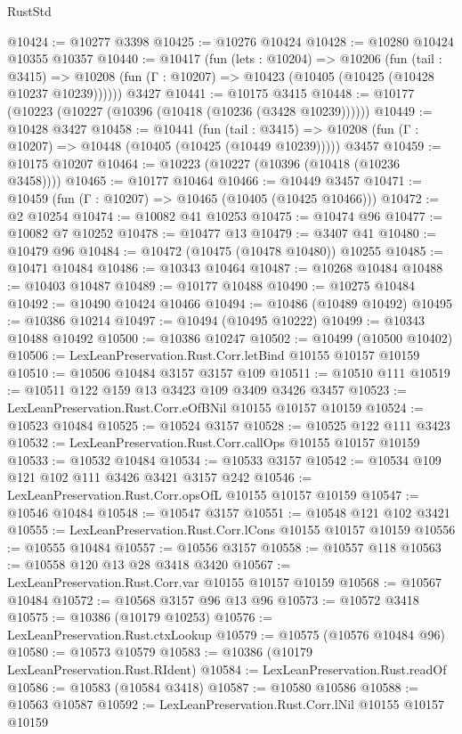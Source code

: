 \begin{lexlean}{RustStd}
\begin{coremodule}
@10424 := @10277 @3398
@10425 := @10276 @10424
@10428 := @10280 @10424 @10355 @10357
@10440 := @10417
    (fun (lets : @10204) =>
    @10206
      (fun (tail : @3415) =>
      @10208 (fun (Γ : @10207) => @10423 (@10405 (@10425 (@10428 @10237 @10239))))))
    @3427
@10441 := @10175 @3415
@10448 := @10177 (@10223 (@10227 (@10396 (@10418 (@10236 (@3428 @10239))))))
@10449 := @10428 @3427
@10458 := @10441
    (fun (tail : @3415) => @10208 (fun (Γ : @10207) => @10448 (@10405 (@10425 (@10449 @10239)))))
    @3457
@10459 := @10175 @10207
@10464 := @10223 (@10227 (@10396 (@10418 (@10236 @3458))))
@10465 := @10177 @10464
@10466 := @10449 @3457
@10471 := @10459 (fun (Γ : @10207) => @10465 (@10405 (@10425 @10466)))
@10472 := @2 @10254
@10474 := @10082 @41 @10253
@10475 := @10474 @96
@10477 := @10082 @7 @10252
@10478 := @10477 @13
@10479 := @3407 @41
@10480 := @10479 @96
@10484 := @10472 (@10475 (@10478 @10480)) @10255
@10485 := @10471 @10484
@10486 := @10343 @10464
@10487 := @10268 @10484
@10488 := @10403 @10487
@10489 := @10177 @10488
@10490 := @10275 @10484
@10492 := @10490 @10424 @10466
@10494 := @10486 (@10489 @10492)
@10495 := @10386 @10214
@10497 := @10494 (@10495 @10222)
@10499 := @10343 @10488 @10492
@10500 := @10386 @10247
@10502 := @10499 (@10500 @10402)
@10506 := LexLeanPreservation.Rust.Corr.letBind @10155 @10157 @10159
@10510 := @10506 @10484 @3157 @3157 @109
@10511 := @10510 @111
@10519 := @10511 @122 @159 @13 @3423 @109 @3409 @3426 @3457
@10523 := LexLeanPreservation.Rust.Corr.eOfBNil @10155 @10157 @10159
@10524 := @10523 @10484
@10525 := @10524 @3157
@10528 := @10525 @122 @111 @3423
@10532 := LexLeanPreservation.Rust.Corr.callOps @10155 @10157 @10159
@10533 := @10532 @10484
@10534 := @10533 @3157
@10542 := @10534 @109 @121 @102 @111 @3426 @3421 @3157 @242
@10546 := LexLeanPreservation.Rust.Corr.opsOfL @10155 @10157 @10159
@10547 := @10546 @10484
@10548 := @10547 @3157
@10551 := @10548 @121 @102 @3421
@10555 := LexLeanPreservation.Rust.Corr.lCons @10155 @10157 @10159
@10556 := @10555 @10484
@10557 := @10556 @3157
@10558 := @10557 @118
@10563 := @10558 @120 @13 @28 @3418 @3420
@10567 := LexLeanPreservation.Rust.Corr.var @10155 @10157 @10159
@10568 := @10567 @10484
@10572 := @10568 @3157 @96 @13 @96
@10573 := @10572 @3418
@10575 := @10386 (@10179 @10253)
@10576 := LexLeanPreservation.Rust.ctxLookup
@10579 := @10575 (@10576 @10484 @96)
@10580 := @10573 @10579
@10583 := @10386 (@10179 LexLeanPreservation.Rust.RIdent)
@10584 := LexLeanPreservation.Rust.readOf
@10586 := @10583 (@10584 @3418)
@10587 := @10580 @10586
@10588 := @10563 @10587
@10592 := LexLeanPreservation.Rust.Corr.lNil @10155 @10157 @10159

\end{coremodule}
\end{lexlean}
